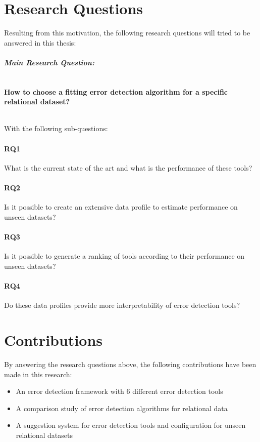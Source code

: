 \section{Research Questions}
\label{sec:researchquestions}
Resulting from this motivation, the following research questions will tried to be answered in this thesis:

\paragraph{\textit{Main Research Question:}} 
~\\\textbf{How to choose a fitting error detection algorithm for a specific relational dataset?}

~\\With the following sub-questions:
\paragraph{RQ1} What is the current state of the art and what is the performance of these tools?

\paragraph{RQ2} Is it possible to create an extensive data profile to estimate performance on unseen datasets?

\paragraph{RQ3} Is it possible to generate a ranking of tools according to their performance on unseen datasets?

\paragraph{RQ4} Do these data profiles provide more interpretability of error detection tools?

\section{Contributions}
\label{sec:contributions}
By answering the research questions above, the following contributions have been made in this research:

\begin{itemize}
    \item An error detection framework with 6 different error detection tools
    \item A comparison study of error detection algorithms for relational data
    \item A suggestion system for error detection tools and configuration for unseen relational datasets
\end{itemize}

